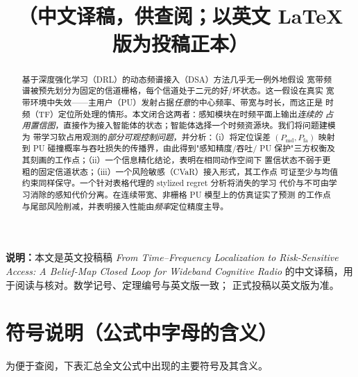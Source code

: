 \documentclass[11pt,a4paper]{article}
\title{\hei{从时频定位到风险敏感接入：\\面向宽带认知无线电的置信图闭环}\\[4pt]
\large （中文译稿，供查阅；以英文 LaTeX 版为投稿正本）}
\author{}
\date{}
\newcommand{\hei}[1]{{\cjkhei #1}}
\theoremstyle{plain}
\theoremstyle{definition}
\newcommand{\Pmd}{P_{\mathrm{md}}}
\newcommand{\Pfa}{P_{\mathrm{fa}}}
\begin{document}
\maketitle

\noindent\textbf{\hei{说明：}}本文是英文投稿稿 \emph{From Time--Frequency
Localization to Risk-Sensitive Access: A Belief-Map Closed Loop for Wideband
Cognitive Radio} 的中文译稿，用于阅读与核对。数学记号、定理编号与英文版一致；
正式投稿以英文版为准。

\begin{abstract}
\noindent 基于深度强化学习（DRL）的动态频谱接入（DSA）方法几乎无一例外地假设
宽带频谱被预先划分为固定的信道栅格，每个信道处于二元的好/坏状态。这一假设在真实
宽带环境中失效——主用户（PU）发射占据\emph{任意}的中心频率、带宽与时长，而这正是
时频（TF）定位所处理的情形。本文闭合这两者：感知模块在时频平面上输出\emph{连续的
占用置信图}，直接作为接入智能体的状态；智能体选择一个时频资源块。我们将问题建模为
带学习软占用观测的\emph{部分可观控制问题}，并分析：（i）将定位误差
$(\Pmd,\Pfa)$ 映射到 PU 碰撞概率与吞吐损失的传播界，由此得到"感知精度/吞吐/
PU 保护"三方权衡及其刻画的工作点；（ii）一个信息精化结论，表明在相同动作空间下
置信状态不弱于更粗的固定信道状态；（iii）一个风险敏感（CVaR）接入形式，其工作点
可证至少与均值约束同样保守。一个针对表格代理的 stylized regret 分析将消失的学习
代价与不可由学习消除的感知代价分离。在连续带宽、非栅格 PU 模型上的仿真证实了预测
的工作点与尾部风险削减，并表明接入性能由\emph{频率}定位精度主导。
\end{abstract}

\section{符号说明（公式中字母的含义）}
为便于查阅，下表汇总全文公式中出现的主要符号及其含义。
\end{document}
